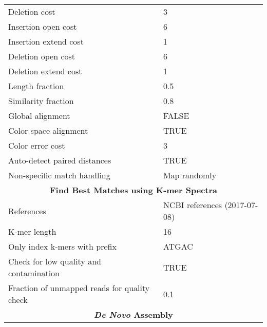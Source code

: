 \begin{scriptsize}
\begin{center}
\begin{longtable}{ll}
Deletion cost                                & 3                                              \\
Insertion open cost                          & 6                                              \\
Insertion extend cost                        & 1                                              \\
Deletion open cost                           & 6                                              \\
Deletion extend cost                         & 1                                              \\
Length fraction                              & 0.5                                            \\
Similarity fraction                          & 0.8                                            \\
Global alignment                             & FALSE                                          \\
Color space alignment                        & TRUE                                           \\
Color error cost                             & 3                                              \\
Auto-detect paired distances                 & TRUE                                           \\
Non-specific match handling                  & Map randomly                                   \\
\midrule
\multicolumn{2}{c}{\textbf{Find Best Matches using K-mer Spectra}}                                     \\\midrule
References                                   & NCBI references (2017-07-08)                   \\
K-mer length                                 & 16                                             \\
Only index k-mers with prefix                & ATGAC                                          \\
Check for low quality and contamination      & TRUE                                           \\
Fraction of unmapped reads for quality check & 0.1                                            \\
\midrule
\multicolumn{2}{c}{\textbf{\textit{De Novo} Assembly}}                                     \\\midrule

\end{longtable}
\end{center}
\end{scriptsize}
